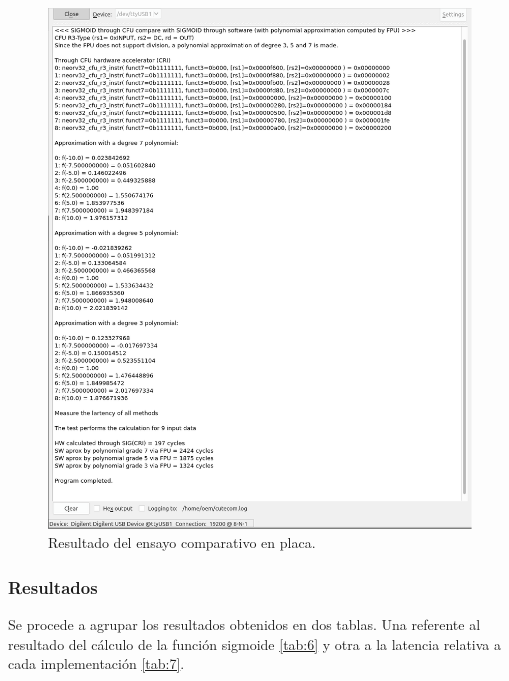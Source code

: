 \begin{figure}[H]
    \centering
    \includegraphics[width=14cm]{Figuras/RES_impl_comp.png}
    \caption{Resultado del ensayo comparativo en placa.}
    \label{fig:impl_comp}
\end{figure}

\subsubsection{Resultados}

Se procede a agrupar los resultados obtenidos en dos tablas.
Una referente al resultado del cálculo de la función sigmoide \ref{tab:6} y otra a la latencia relativa a cada implementación \ref{tab:7}.

